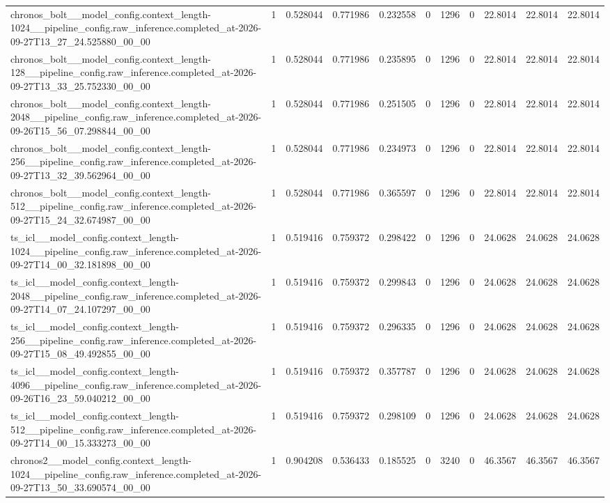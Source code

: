 \begin{tabular}{lllllllllll}
chronos\_bolt\_\_model\_config.context\_length-1024\_\_pipeline\_config.raw\_inference.completed\_at-2026-09-27T13\_27\_24.525880\_00\_00 & 1 & 0.528044 & 0.771986 & 0.232558 & 0 & 1296 & 0 & 22.8014 & 22.8014 & 22.8014 \\
chronos\_bolt\_\_model\_config.context\_length-128\_\_pipeline\_config.raw\_inference.completed\_at-2026-09-27T13\_33\_25.752330\_00\_00 & 1 & 0.528044 & 0.771986 & 0.235895 & 0 & 1296 & 0 & 22.8014 & 22.8014 & 22.8014 \\
chronos\_bolt\_\_model\_config.context\_length-2048\_\_pipeline\_config.raw\_inference.completed\_at-2026-09-26T15\_56\_07.298844\_00\_00 & 1 & 0.528044 & 0.771986 & 0.251505 & 0 & 1296 & 0 & 22.8014 & 22.8014 & 22.8014 \\
chronos\_bolt\_\_model\_config.context\_length-256\_\_pipeline\_config.raw\_inference.completed\_at-2026-09-27T13\_32\_39.562964\_00\_00 & 1 & 0.528044 & 0.771986 & 0.234973 & 0 & 1296 & 0 & 22.8014 & 22.8014 & 22.8014 \\
chronos\_bolt\_\_model\_config.context\_length-512\_\_pipeline\_config.raw\_inference.completed\_at-2026-09-27T15\_24\_32.674987\_00\_00 & 1 & 0.528044 & 0.771986 & 0.365597 & 0 & 1296 & 0 & 22.8014 & 22.8014 & 22.8014 \\
ts\_icl\_\_model\_config.context\_length-1024\_\_pipeline\_config.raw\_inference.completed\_at-2026-09-27T14\_00\_32.181898\_00\_00 & 1 & 0.519416 & 0.759372 & 0.298422 & 0 & 1296 & 0 & 24.0628 & 24.0628 & 24.0628 \\
ts\_icl\_\_model\_config.context\_length-2048\_\_pipeline\_config.raw\_inference.completed\_at-2026-09-27T14\_07\_24.107297\_00\_00 & 1 & 0.519416 & 0.759372 & 0.299843 & 0 & 1296 & 0 & 24.0628 & 24.0628 & 24.0628 \\
ts\_icl\_\_model\_config.context\_length-256\_\_pipeline\_config.raw\_inference.completed\_at-2026-09-27T15\_08\_49.492855\_00\_00 & 1 & 0.519416 & 0.759372 & 0.296335 & 0 & 1296 & 0 & 24.0628 & 24.0628 & 24.0628 \\
ts\_icl\_\_model\_config.context\_length-4096\_\_pipeline\_config.raw\_inference.completed\_at-2026-09-26T16\_23\_59.040212\_00\_00 & 1 & 0.519416 & 0.759372 & 0.357787 & 0 & 1296 & 0 & 24.0628 & 24.0628 & 24.0628 \\
ts\_icl\_\_model\_config.context\_length-512\_\_pipeline\_config.raw\_inference.completed\_at-2026-09-27T14\_00\_15.333273\_00\_00 & 1 & 0.519416 & 0.759372 & 0.298109 & 0 & 1296 & 0 & 24.0628 & 24.0628 & 24.0628 \\
chronos2\_\_model\_config.context\_length-1024\_\_pipeline\_config.raw\_inference.completed\_at-2026-09-27T13\_50\_33.690574\_00\_00 & 1 & 0.904208 & 0.536433 & 0.185525 & 0 & 3240 & 0 & 46.3567 & 46.3567 & 46.3567 \\

\end{tabular}
